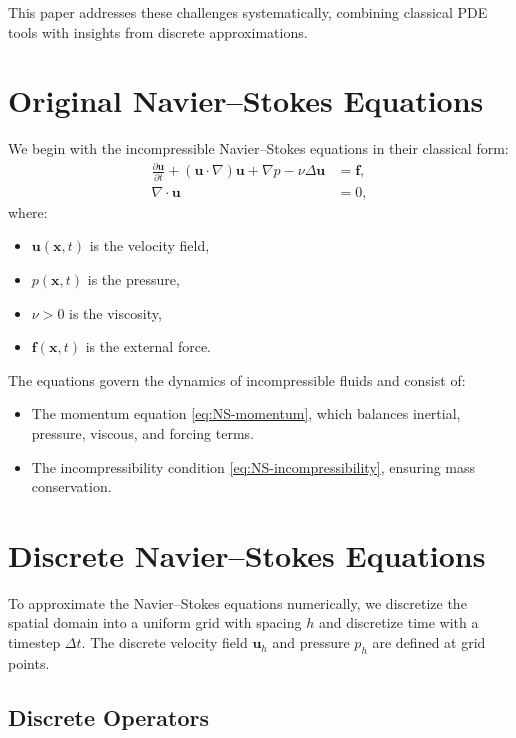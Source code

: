 \documentclass[12pt]{article}
\begin{document}
This paper addresses these challenges systematically, combining classical PDE tools with insights from discrete approximations.

\section{Original Navier--Stokes Equations}

We begin with the incompressible Navier--Stokes equations in their classical form:
\begin{align}
\frac{\partial \mathbf{u}}{\partial t} + (\mathbf{u} \cdot \nabla) \mathbf{u} + \nabla p - \nu \Delta \mathbf{u} &= \mathbf{f}, \label{eq:NS-momentum} \\
\nabla \cdot \mathbf{u} &= 0, \label{eq:NS-incompressibility}
\end{align}
where:
\begin{itemize}
    \item $\mathbf{u}(\mathbf{x}, t)$ is the velocity field,
    \item $p(\mathbf{x}, t)$ is the pressure,
    \item $\nu > 0$ is the viscosity,
    \item $\mathbf{f}(\mathbf{x}, t)$ is the external force.
\end{itemize}

The equations govern the dynamics of incompressible fluids and consist of:
\begin{itemize}
    \item The momentum equation \eqref{eq:NS-momentum}, which balances inertial, pressure, viscous, and forcing terms.
    \item The incompressibility condition \eqref{eq:NS-incompressibility}, ensuring mass conservation.
\end{itemize}

\section{Discrete Navier--Stokes Equations}

To approximate the Navier--Stokes equations numerically, we discretize the spatial domain into a uniform grid with spacing $h$ and discretize time with a timestep $\Delta t$. The discrete velocity field $\mathbf{u}_h$ and pressure $p_h$ are defined at grid points.

\subsection{Discrete Operators}
\end{document}
